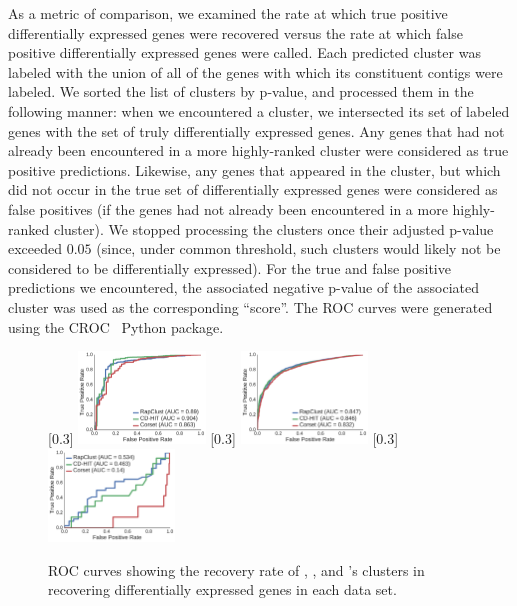 As a metric of comparison, we examined the rate at which true positive differentially expressed genes were recovered versus the rate at which false positive differentially expressed genes were called. Each predicted cluster was labeled with the union of all of the genes with which its constituent contigs were labeled. We sorted the list of clusters by p-value, and processed them in the following manner: when we encountered a cluster, we intersected its set of labeled genes with the set of truly differentially expressed genes. Any genes that had not already been encountered in a more highly-ranked cluster were considered as true positive predictions. Likewise, any genes that appeared in the cluster, but which did not occur in the true set of differentially expressed genes were considered as false positives (if the genes had not already been encountered in a more highly-ranked cluster). We stopped processing the clusters once their adjusted p-value exceeded $0.05$ (since, under common threshold, such clusters would likely not be considered to be differentially expressed). For the true and false positive predictions we encountered, the associated negative p-value of the associated cluster was used as the corresponding ``score''. The ROC curves were generated using the CROC~\cite{croc} Python package.

\begin{figure}[thb!]
    \centering
    [0.3\textwidth]{
        \includegraphics[width=0.3\textwidth]{Figures/yeast_dge_curves}}
    [0.3\textwidth]{
        \includegraphics[width=0.3\textwidth]{Figures/human_dge_curves}}
    [0.3\textwidth]{
        \includegraphics[width=0.3\textwidth]{Figures/chicken_dge_curves}}
    \caption{ROC curves showing the recovery rate of \rapclust, \corset, and \cdhit's clusters in recovering 
        differentially expressed genes in each data set.\label{fig:ROC}}
\end{figure}

